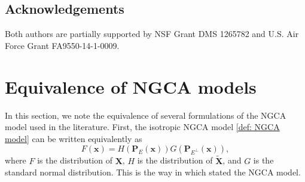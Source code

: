 \documentclass[final,12pt]{colt2018} %
\numberwithin{equation}{section}
\newcommand{\boldx}{\textbf{x}}
\newcommand{\boldP}{\textbf{P}}
\newcommand{\boldX}{\textbf{X}}
\begin{document}
\subsection*{Acknowledgements}

Both authors are partially supported by NSF Grant DMS 1265782 and U.S. Air Force Grant FA9550-14-1-0009.

\nocite{*}



\appendix

\section{Equivalence of NGCA models}

In this section, we note the equivalence of several formulations of the NGCA model used in the literature. First, the isotropic NGCA model \eqref{def: NGCA model} can be written equivalently as
\begin{equation*} \label{eq:Vempala_model}
F(\boldx) = H(\boldP_E(\boldx)) G(\boldP_{E^\perp}(\boldx)),
\end{equation*}
where $F$ is the distribution of $\boldX$, $H$ is the distribution of $\tilde{\boldX}$, and $G$ is the standard normal distribution. This is the way in which \cite{Vempala2011} stated the NGCA model. 
\end{document}
